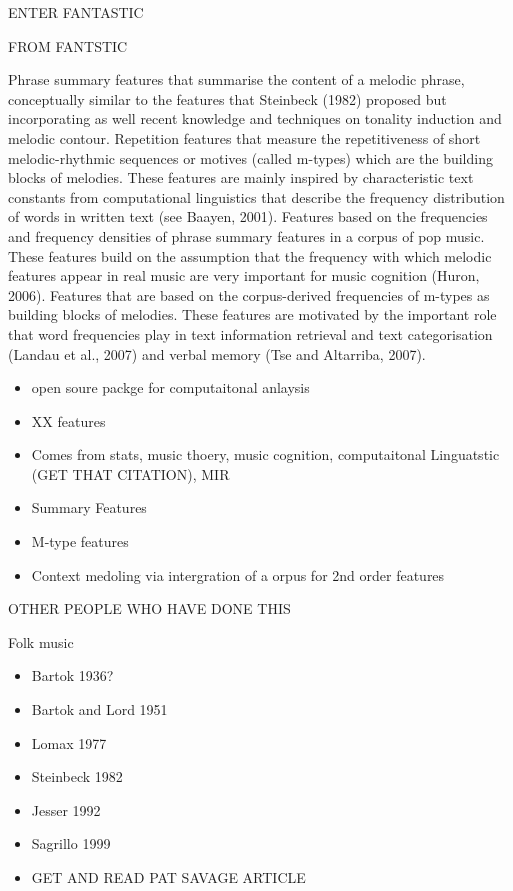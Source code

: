 \documentclass[]{book}
\providecommand{\tightlist}{%
  \setlength{\itemsep}{0pt}\setlength{\parskip}{0pt}}
\theoremstyle{definition}
\theoremstyle{definition}
\theoremstyle{definition}
\theoremstyle{remark}
\begin{document}
ENTER FANTASTIC

FROM FANTSTIC

Phrase summary features that summarise the content of a melodic phrase,
conceptually similar to the features that Steinbeck (1982) proposed but
incorporating as well recent knowledge and techniques on tonality
induction and melodic contour. Repetition features that measure the
repetitiveness of short melodic-rhythmic sequences or motives (called
m-types) which are the building blocks of melodies. These features are
mainly inspired by characteristic text constants from computational
linguistics that describe the frequency distribution of words in written
text (see Baayen, 2001). Features based on the frequencies and frequency
densities of phrase summary features in a corpus of pop music. These
features build on the assumption that the frequency with which melodic
features appear in real music are very important for music cognition
(Huron, 2006). Features that are based on the corpus-derived frequencies
of m-types as building blocks of melodies. These features are motivated
by the important role that word frequencies play in text information
retrieval and text categorisation (Landau et al., 2007) and verbal
memory (Tse and Altarriba, 2007).

\begin{itemize}
\tightlist
\item
  open soure packge for computaitonal anlaysis
\item
  XX features
\item
  Comes from stats, music thoery, music cognition, computaitonal
  Linguatstic (GET THAT CITATION), MIR
\item
  Summary Features
\item
  M-type features
\item
  Context medoling via intergration of a orpus for 2nd order features
\end{itemize}

OTHER PEOPLE WHO HAVE DONE THIS

Folk music

\begin{itemize}
\item
  Bartok 1936?
\item
  Bartok and Lord 1951
\item
  Lomax 1977
\item
  Steinbeck 1982
\item
  Jesser 1992
\item
  Sagrillo 1999
\item
  GET AND READ PAT SAVAGE ARTICLE
\end{itemize}
\end{document}
